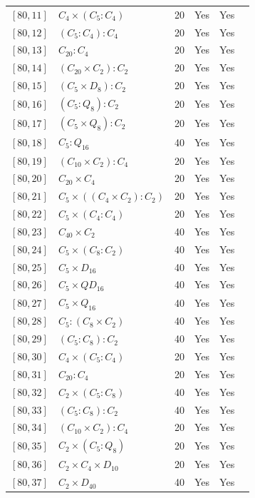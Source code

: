\documentclass[12pt, a4paper]{article}
\theoremstyle{plain}
\theoremstyle{definition}
\begin{document}
\begin{longtable}{llcccl}
  $[80,11]$ & $C_4 \times (C_5 : C_4)$ & 20 & Yes & Yes \\
  $[80,12]$ & $(C_5 : C_4) : C_4$ & 20 & Yes & Yes \\
  $[80,13]$ & $C_{20} : C_4$ & 20 & Yes & Yes \\
  $[80,14]$ & $(C_{20} \times C_2) : C_2$ & 20 & Yes & Yes \\
  $[80,15]$ & $(C_5 \times D_8) : C_2$ & 20 & Yes & Yes \\
  $[80,16]$ & $(C_5 : Q_8) : C_2$ & 20 & Yes & Yes \\
  $[80,17]$ & $(C_5 \times Q_8) : C_2$ & 20 & Yes & Yes \\
  $[80,18]$ & $C_5 : Q_{16}$ & 40 & Yes & Yes \\
  $[80,19]$ & $(C_{10} \times C_2) : C_4$ & 20 & Yes & Yes \\
  $[80,20]$ & $C_{20} \times C_4$ & 20 & Yes & Yes \\
  $[80,21]$ & $C_5 \times ((C_4 \times C_2) : C_2)$ & 20 & Yes & Yes \\
  $[80,22]$ & $C_5 \times (C_4 : C_4)$ & 20 & Yes & Yes \\
  $[80,23]$ & $C_{40} \times C_2$ & 40 & Yes & Yes \\
  $[80,24]$ & $C_5 \times (C_8 : C_2)$ & 40 & Yes & Yes \\
  $[80,25]$ & $C_5 \times D_{16}$ & 40 & Yes & Yes \\
  $[80,26]$ & $C_5 \times QD_{16}$ & 40 & Yes & Yes \\
  $[80,27]$ & $C_5 \times Q_{16}$ & 40 & Yes & Yes \\
  $[80,28]$ & $C_5 : (C_8 \times C_2)$ & 40 & Yes & Yes \\
  $[80,29]$ & $(C_5 : C_8) : C_2$ & 40 & Yes & Yes \\
  $[80,30]$ & $C_4 \times (C_5 : C_4)$ & 20 & Yes & Yes \\
  $[80,31]$ & $C_{20} : C_4$ & 20 & Yes & Yes \\
  $[80,32]$ & $C_2 \times (C_5 : C_8)$ & 40 & Yes & Yes \\
  $[80,33]$ & $(C_5 : C_8) : C_2$ & 40 & Yes & Yes \\
  $[80,34]$ & $(C_{10} \times C_2) : C_4$ & 20 & Yes & Yes \\
  $[80,35]$ & $C_2 \times (C_5 : Q_8)$ & 20 & Yes & Yes \\
  $[80,36]$ & $C_2 \times C_4 \times D_{10}$ & 20 & Yes & Yes \\
  $[80,37]$ & $C_2 \times D_{40}$ & 40 & Yes & Yes \\

\end{longtable}
\end{document}
